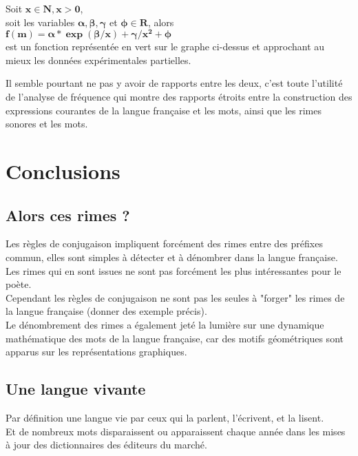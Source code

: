 \documentclass[french]{article}
\begin{document}
\begin{center}
Soit $ \mathbf{x \in N, x > 0} $,\\
soit les variables $ \mathbf{\alpha, \beta, \gamma} $ et $ \mathbf{\phi \in R} $, alors\\
$ \mathbf{f(m) = \alpha * \exp(\beta/x) + \gamma / x^2 + \phi} $\\
est un fonction représentée en vert sur le graphe ci-dessus et approchant au mieux les données expérimentales partielles.\\
\end{center}
Il semble pourtant ne pas y avoir de rapports entre les deux, c'est toute  l'utilité de l'analyse de fréquence qui montre des rapports étroits entre la construction des expressions courantes de la langue française et les mots, ainsi que les rimes sonores et les mots.\\
\newpage
\section{Conclusions}
\subsection{Alors ces rimes ?}
Les règles de conjugaison impliquent forcément des rimes entre des préfixes commun, elles sont simples à détecter et à dénombrer dans la langue française.\\
Les rimes qui en sont issues ne sont pas forcément les plus intéressantes pour le poète.\\
Cependant les règles de conjugaison ne sont pas les seules à "forger" les rimes de la langue française (donner des exemple précis).\\
Le dénombrement des rimes a également jeté la lumière sur une dynamique mathématique des mots de la langue française, car des motifs géométriques sont apparus sur les représentations graphiques.
\subsection{Une langue vivante }
Par définition une langue vie par ceux qui la parlent, l'écrivent, et la lisent.\\
Et de nombreux mots disparaissent ou apparaissent chaque année dans les mises à jour des dictionnaires des éditeurs du marché.
\end{document}
